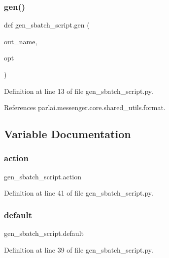 \subsubsection{\texorpdfstring{gen()}{gen()}}
{\footnotesize\ttfamily def gen\+\_\+sbatch\+\_\+script.\+gen (\begin{DoxyParamCaption}\item[{}]{out\+\_\+name,  }\item[{}]{opt }\end{DoxyParamCaption})}



Definition at line 13 of file gen\+\_\+sbatch\+\_\+script.\+py.



References parlai.\+messenger.\+core.\+shared\+\_\+utils.\+format.



\subsection{Variable Documentation}
\mbox{\label{namespacegen__sbatch__script_a30ced515736488a43ed26cfc9bdaac71}} 
\subsubsection{\texorpdfstring{action}{action}}
{\footnotesize\ttfamily gen\+\_\+sbatch\+\_\+script.\+action}



Definition at line 41 of file gen\+\_\+sbatch\+\_\+script.\+py.

\mbox{\label{namespacegen__sbatch__script_a4645a5a9d1f03663097b963a4a6b6a6b}} 
\subsubsection{\texorpdfstring{default}{default}}
{\footnotesize\ttfamily gen\+\_\+sbatch\+\_\+script.\+default}



Definition at line 39 of file gen\+\_\+sbatch\+\_\+script.\+py.

